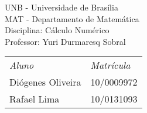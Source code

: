 \newpage
\begin{flushleft}
    {UNB - Universidade de Bras\'ilia\\}
    {MAT - Departamento de Matem\'atica\\}
    {Disciplina: C\'alculo Numérico\\}
    {Professor: Yuri Durmaresq Sobral\\}
\end{flushleft}
      \vspace{6.0cm}
      \begin{center}
      {\Huge \tituloCapa}
      \end{center}
      \vspace{8.0cm}
      
 \begin{tabular}{ll}
 \textit{Aluno} & \textit{Matr\'icula}\\
 Di\'ogenes Oliveira & 10/0009972\\
 Rafael Lima & 10/0131093\\
 \end{tabular}

\newpage
